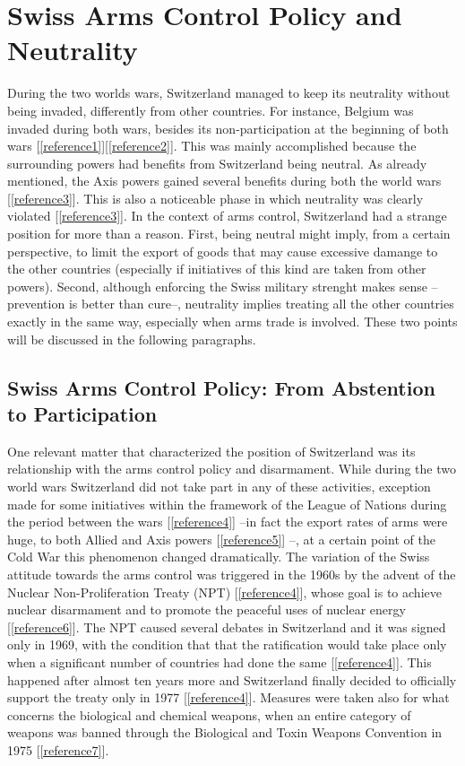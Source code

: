 \documentclass[a4paper]{article}
\begin{document}
\section{Swiss Arms Control Policy and Neutrality}
During the two worlds wars, Switzerland managed to keep its neutrality without being invaded, differently from other countries. For instance, Belgium was invaded during both wars, besides its non-participation at the beginning of both wars [\ref{reference1}][\ref{reference2}]. This was mainly accomplished because the surrounding powers had benefits from Switzerland being neutral. As already mentioned, the Axis powers gained several benefits during both the world wars [\ref{reference3}]. This is also a noticeable phase in which neutrality was clearly violated [\ref{reference3}]. In the context of arms control, Switzerland had a strange position for more than a reason. First, being neutral might imply, from a certain perspective, to limit the export of goods that may cause excessive damange to the other countries (especially if initiatives of this kind are taken from other powers). Second, although enforcing the Swiss military strenght makes sense --prevention is better than cure--, neutrality implies treating all the other countries exactly in the same way, especially when arms trade is involved. These two points will be discussed in the following paragraphs.
\subsection{Swiss Arms Control Policy: From Abstention to Participation}
One relevant matter that characterized the position of Switzerland was its relationship with the arms control policy and disarmament. While during the two world wars Switzerland did not take part in any of these activities, exception made for some initiatives within the framework of the League of Nations during the period between the wars [\ref{reference4}] --in fact the export rates of arms were huge, to both Allied and Axis powers [\ref{reference5}] --, at a certain point of the Cold War this phenomenon changed dramatically. The variation of the Swiss attitude towards the arms control was triggered in the 1960s by the advent of the Nuclear Non-Proliferation Treaty (NPT) [\ref{reference4}], whose goal is to achieve nuclear disarmament and to promote the peaceful uses of nuclear energy [\ref{reference6}]. The NPT caused several debates in Switzerland and it was signed only in 1969, with the condition that that the ratification would take place only when a significant number of countries had done the same [\ref{reference4}]. This happened after almost ten years more and Switzerland finally decided to officially support the treaty only in 1977 [\ref{reference4}]. Measures were taken also for what concerns the biological and chemical weapons, when an entire category of weapons was banned through the Biological and Toxin Weapons Convention in 1975 [\ref{reference7}].
\end{document}
